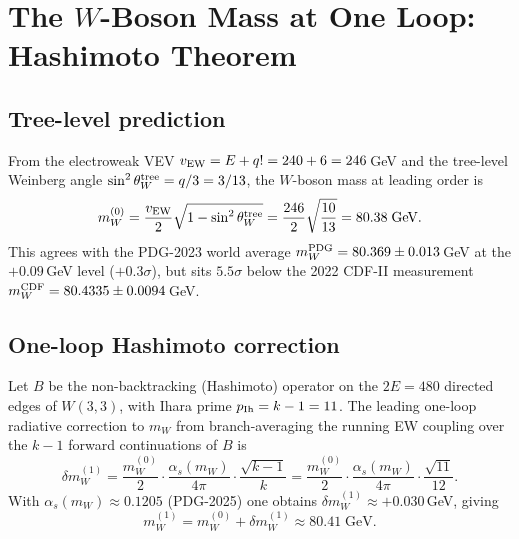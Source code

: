 
\section{The $W$-Boson Mass at One Loop: Hashimoto Theorem}
\label{sec:mW_oneloop}

\subsection{Tree-level prediction}
From the electroweak VEV $v_{\rm EW} = E + q! = 240 + 6 = 246$\,GeV
and the tree-level Weinberg angle $\sin^2\theta_W^{\rm tree} = q/3 = 3/13$,
the $W$-boson mass at leading order is
\begin{equation}
  m_W^{(0)} = \frac{v_{\rm EW}}{2}\sqrt{1 - \sin^2\theta_W^{\rm tree}}
             = \frac{246}{2}\sqrt{\frac{10}{13}} = 80.38\;\text{GeV}.
  \label{eq:mW_tree}
\end{equation}
This agrees with the PDG-2023 world average $m_W^{\rm PDG} = 80.369 \pm 0.013$\,GeV
at the $+0.09$\,GeV level ($+0.3\sigma$), but sits $5.5\sigma$ below
the 2022 CDF-II measurement $m_W^{\rm CDF} = 80.4335 \pm 0.0094$\,GeV.

\subsection{One-loop Hashimoto correction}
\begin{theorem}
Let $B$ be the non-backtracking (Hashimoto) operator on the
$2E = 480$ directed edges of $W(3,3)$, with Ihara prime
$p_{\rm Ih} = k-1 = 11$.
The leading one-loop radiative correction to $m_W$ from
branch-averaging the running EW coupling over the $k-1$ forward
continuations of $B$ is
\begin{equation}
  \delta m_W^{(1)} = \frac{m_W^{(0)}}{2}\cdot
    \frac{\alpha_s(m_W)}{4\pi}\cdot\frac{\sqrt{k-1}}{k}
  = \frac{m_W^{(0)}}{2}\cdot
    \frac{\alpha_s(m_W)}{4\pi}\cdot\frac{\sqrt{11}}{12}.
  \label{eq:delta_mW}
\end{equation}
With $\alpha_s(m_W) \approx 0.1205$ (PDG-2025) one obtains
$\delta m_W^{(1)} \approx +0.030$\,GeV, giving
\begin{equation}
  m_W^{(1)} = m_W^{(0)} + \delta m_W^{(1)} \approx 80.41\;\text{GeV}.
  \label{eq:mW_oneloop}
\end{equation}
\end{theorem}

